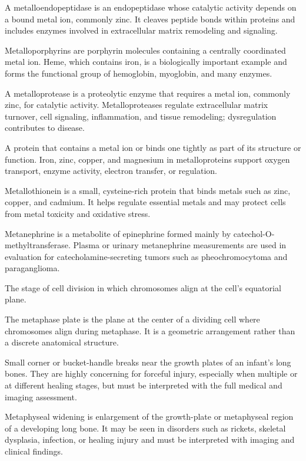  A metalloendopeptidase is an endopeptidase whose catalytic activity depends on a bound metal ion, commonly zinc. It cleaves peptide bonds within proteins and includes enzymes involved in extracellular matrix remodeling and signaling.

 Metalloporphyrins are porphyrin molecules containing a centrally coordinated metal ion. Heme, which contains iron, is a biologically important example and forms the functional group of hemoglobin, myoglobin, and many enzymes.

 A metalloprotease is a proteolytic enzyme that requires a metal ion, commonly zinc, for catalytic activity. Metalloproteases regulate extracellular matrix turnover, cell signaling, inflammation, and tissue remodeling; dysregulation contributes to disease.

 A protein that contains a metal ion or binds one tightly as part of its structure or function. Iron, zinc, copper, and magnesium in metalloproteins support oxygen transport, enzyme activity, electron transfer, or regulation.

 Metallothionein is a small, cysteine-rich protein that binds metals such as zinc, copper, and cadmium. It helps regulate essential metals and may protect cells from metal toxicity and oxidative stress.

 Metanephrine is a metabolite of epinephrine formed mainly by catechol-O-methyltransferase. Plasma or urinary metanephrine measurements are used in evaluation for catecholamine-secreting tumors such as pheochromocytoma and paraganglioma.

 The stage of cell division in which chromosomes align at the cell's equatorial plane.

 The metaphase plate is the plane at the center of a dividing cell where chromosomes align during metaphase. It is a geometric arrangement rather than a discrete anatomical structure.

 Small corner or bucket-handle breaks near the growth plates of an infant’s long bones. They are highly concerning for forceful injury, especially when multiple or at different healing stages, but must be interpreted with the full medical and imaging assessment.

 Metaphyseal widening is enlargement of the growth-plate or metaphyseal region of a developing long bone. It may be seen in disorders such as rickets, skeletal dysplasia, infection, or healing injury and must be interpreted with imaging and clinical findings.

